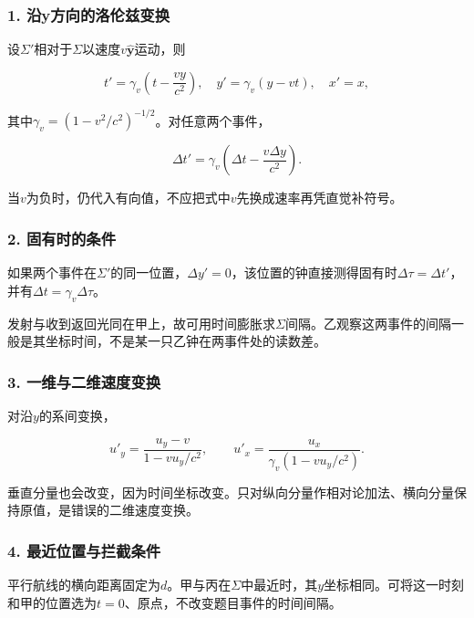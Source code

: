 \documentclass[12pt,a4paper,fontset=fandol]{ctexart}
\begin{document}
\subsubsection{1.
沿y方向的洛伦兹变换}\label{ux6cbfyux65b9ux5411ux7684ux6d1bux4f26ux5179ux53d8ux6362}

设\(\Sigma'\)相对于\(\Sigma\)以速度\(v\hat{\mathbf y}\)运动，则

\[
t'=\gamma_v\left(t-\frac{vy}{c^2}\right),
\quad
y'=\gamma_v(y-vt),
\quad x'=x,
\]

其中\(\gamma_v=(1-v^2/c^2)^{-1/2}\)。对任意两个事件，

\[
\Delta t'=\gamma_v
\left(\Delta t-\frac{v\Delta y}{c^2}\right).
\]

当\(v\)为负时，仍代入有向值，不应把式中\(v\)先换成速率再凭直觉补符号。

\subsubsection{2.
固有时的条件}\label{ux56faux6709ux65f6ux7684ux6761ux4ef6}

如果两个事件在\(\Sigma'\)的同一位置，\(\Delta y'=0\)，该位置的钟直接测得固有时\(\Delta\tau=\Delta t'\)，并有\(\Delta t=\gamma_v\Delta\tau\)。

发射与收到返回光同在甲上，故可用时间膨胀求\(\Sigma\)间隔。乙观察这两事件的间隔一般是其坐标时间，不是某一只乙钟在两事件处的读数差。

\subsubsection{3.
一维与二维速度变换}\label{ux4e00ux7ef4ux4e0eux4e8cux7ef4ux901fux5ea6ux53d8ux6362}

对沿\(y\)的系间变换，

\[
u'_y=\frac{u_y-v}{1-vu_y/c^2},
\qquad
u'_x=\frac{u_x}
{\gamma_v(1-vu_y/c^2)}.
\]

垂直分量也会改变，因为时间坐标改变。只对纵向分量作相对论加法、横向分量保持原值，是错误的二维速度变换。

\subsubsection{4.
最近位置与拦截条件}\label{ux6700ux8fd1ux4f4dux7f6eux4e0eux62e6ux622aux6761ux4ef6}

平行航线的横向距离固定为\(d\)。甲与丙在\(\Sigma\)中最近时，其\(y\)坐标相同。可将这一时刻和甲的位置选为\(t=0\)、原点，不改变题目事件的时间间隔。
\end{document}
